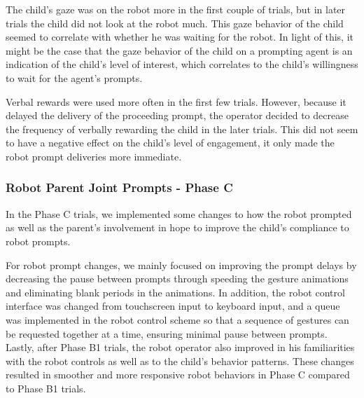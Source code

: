 The child's gaze was on the robot more in the first couple of trials, but in later trials the child did not look at the robot much.  This gaze behavior of the child seemed to correlate with whether he was waiting for the robot.  In light of this, it might be the case that the gaze behavior of the child on a prompting agent is an indication of the child's level of interest, which correlates to the child's willingness to wait for the agent's prompts.

Verbal rewards were used more often in the first few trials.  However, because it delayed the delivery of the proceeding prompt, the operator decided to decrease the frequency of verbally rewarding the child in the later trials.  This did not seem to have a negative effect on the child's level of engagement, it only made the robot prompt deliveries more immediate.

\subsubsection{Robot Parent Joint Prompts - Phase C}
In the Phase C trials, we implemented some changes to how the robot prompted as well as the parent's involvement in hope to improve the child's compliance to robot prompts.

For robot prompt changes, we mainly focused on improving the prompt delays by decreasing the pause between prompts through speeding the gesture animations and eliminating blank periods in the animations.  In addition, the robot control interface was changed from touchscreen input to keyboard input, and a queue was implemented in the robot control scheme so that a sequence of gestures can be requested together at a time, ensuring minimal pause between prompts.  Lastly, after Phase B1 trials, the robot operator also improved in his familiarities with the robot controls as well as to the child's behavior patterns.  These changes resulted in smoother and more responsive robot behaviors in Phase C compared to Phase B1 trials.

